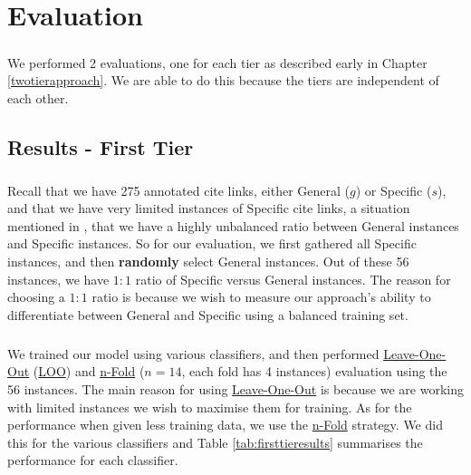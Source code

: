 \chapter{Evaluation}
\label{evaluation}
\paragraph{}
We performed 2 evaluations, one for each tier as described early in Chapter \ref{twotierapproach}. We are able to do this because the tiers are independent of each other.

\section{Results - First Tier}
\paragraph{}
Recall that we have 275 annotated cite links, either General ($g$) or Specific ($s$), and that we have very limited instances of Specific cite links, a situation mentioned in \cite{li2010negative}, that we have a highly unbalanced ratio between General instances and Specific instances. So for our evaluation, we first gathered all Specific instances, and then \textbf{randomly} select General instances. Out of these 56 instances, we have $1:1$ ratio of Specific versus General instances. The reason for choosing a $1:1$ ratio is because we wish to measure our approach's ability to differentiate between General and Specific using a balanced training set.

\paragraph{}
We trained our model using various classifiers, and then performed \url{Leave-One-Out} (\url{LOO}) and \url{n-Fold} ($n=14$, each fold has 4 instances) evaluation using the 56 instances. The main reason for using \url{Leave-One-Out} is because we are working with limited instances we wish to maximise them for training. As for the performance when given less training data, we use the \url{n-Fold} strategy. We did this for the various classifiers and Table \ref{tab:firsttieresults} summarises the performance for each classifier.

